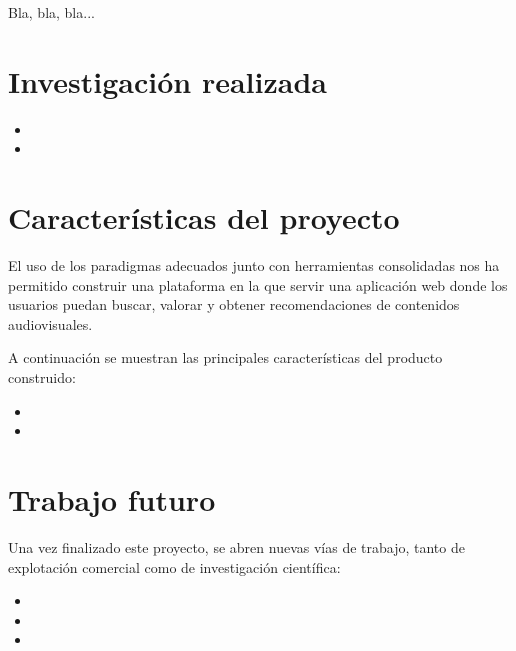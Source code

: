 
Bla, bla, bla...

\section{Investigación realizada}

\begin{itemize}
\item 

\item 
\end{itemize}


\section{Características del proyecto}
El uso de los paradigmas adecuados junto con herramientas consolidadas nos ha permitido construir una plataforma en la que servir una aplicación web donde los usuarios puedan buscar, valorar y obtener recomendaciones de contenidos audiovisuales.

A continuación se muestran las principales características del producto construido:

\begin{itemize}
\item 
\item 
\end{itemize}


\section{Trabajo futuro}
Una vez finalizado este proyecto, se abren nuevas vías de trabajo, tanto de explotación comercial como de investigación científica:

\begin{itemize}
\item 
\item 
\item 
\end{itemize}
